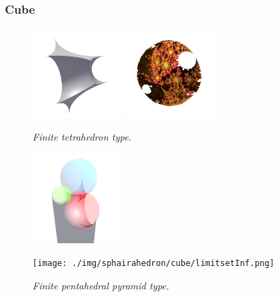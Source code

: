 \documentclass[suppldata, dvipdfmx]{interact}
\theoremstyle{plain}%
\theoremstyle{definition}
\theoremstyle{remark}
\theoremstyle{problemstyle}
\begin{document}
\subsubsection{Cube}
\begin{figure}[H]
 \begin{minipage}{0.5\textwidth}
  \begin{minipage}[t]{0.24\textwidth}
   \centering
   \includegraphics[width=1.35in, height=1.35in,
   keepaspectratio]{./img/sphairahedron/cube/sphairahedronFinite.png}
  \end{minipage}
  \hspace*{\fill}
  \begin{minipage}[t]{0.24\textwidth}
   \centering
   \includegraphics[width=1.35in, height=1.35in,
   keepaspectratio]{./img/sphairahedron/cube/limitsetFinite.png}
  \end{minipage}
  \hspace*{\fill}
  \caption{\textit{Finite tetrahedron type.}}
  \label{fig:cubeFinite}
 \end{minipage}
 \hspace*{\fill}
 \begin{minipage}{0.5\textwidth}
  \begin{minipage}[t]{0.24\textwidth}
   \centering
   \includegraphics[width=1.35in, height=1.35in,
   keepaspectratio]{./img/sphairahedron/cube/sphairahedronInf.png}
  \end{minipage}
  \hspace*{\fill}
  \begin{minipage}[t]{0.24\textwidth}
   \centering
   \texttt{[image: ./img/sphairahedron/cube/limitsetInf.png]} 
  \end{minipage}
  \hspace*{\fill}
  \caption{\textit{Finite pentahedral pyramid type.}}
  \label{fig:cubeInf}
  \end{minipage}
\end{figure}
\end{document}
